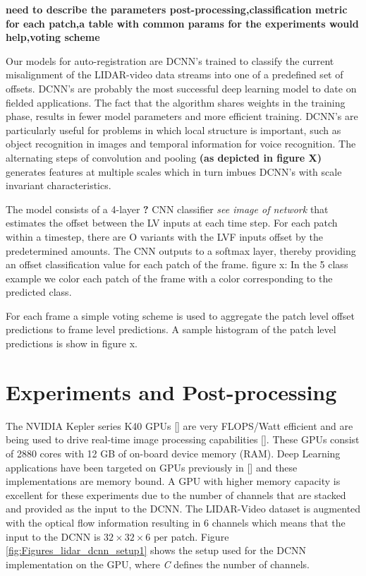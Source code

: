 \documentclass{article}
\begin{document}
\textbf{need to describe the parameters post-processing,classification metric for each patch,a table with common params for the experiments would help,voting scheme}

Our models for auto-registration are DCNN's trained to classify the current misalignment of the LIDAR-video data streams into one of a predefined set of offsets. DCNN's are probably the most successful deep learning model to date on fielded applications. The fact that the algorithm shares weights in the training phase, results in fewer model parameters and more efficient training. DCNN's are particularly useful for problems in which local structure is important, such as object recognition in images and temporal information for voice recognition. The alternating steps of convolution and pooling \textbf{(as depicted in figure X)}  generates features at multiple scales which in turn imbues DCNN's with scale invariant characteristics.


The model consists of a 4-layer \textbf{?} CNN classifier \textit{see image of network} that estimates the offset between the LV inputs at each time step. For each patch within a timestep, there are O variants with the LVF inputs offset by the predetermined amounts. The CNN outputs to a softmax layer, thereby providing an offset classification value for each patch of the frame. 
figure x: In the 5 class example we color each patch of the frame with a color corresponding to the predicted class. 

For each frame a simple voting scheme is used to aggregate the patch level offset predictions to frame level predictions. A sample histogram of the patch level predictions is show in figure x.




\section{Experiments and Post-processing} %
\label{sec:experiments_and_post_processing}

The NVIDIA Kepler series K40 GPUs [\cite{NVIDIA-Inc.2012NVIDIAs-Ne}] are very FLOPS/Watt efficient and are being used to drive real-time image processing capabilities [\cite{Venugopal2013Accelerati}]. These GPUs consist of 2880 cores with 12 GB of on-board device memory (RAM). Deep Learning applications have been targeted on GPUs previously in [\cite{Krizhevsky2012Imagenet-C}] and these implementations are memory bound. A GPU with higher memory capacity is excellent for these experiments due to the number of channels that are stacked and provided as the input to the DCNN. The LIDAR-Video dataset is augmented with the optical flow information resulting in 6 channels which means that the input to the DCNN is $32\times32\times6$ per patch. Figure \ref{fig:Figures_lidar_dcnn_setup1} shows the setup used for the DCNN implementation on the GPU, where \emph{C} defines the number of channels.
\end{document}
